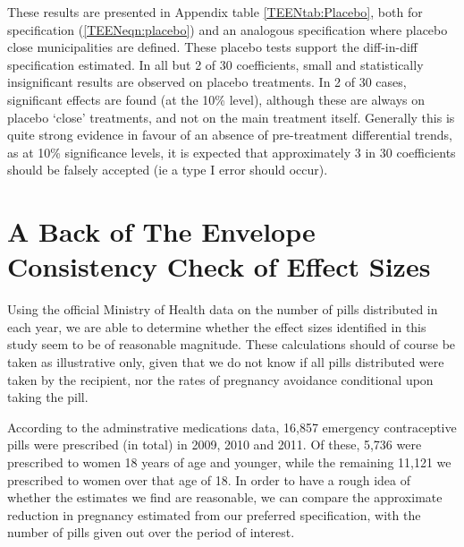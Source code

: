 \documentclass[11pt,subeqn]{article}
\begin{document}
\begin{spacing}{1.4}
These results are presented in Appendix table \ref{TEENtab:Placebo}, both for 
specification (\ref{TEENeqn:placebo}) and an analogous specification where 
placebo close municipalities are defined.  These placebo tests support the 
diff-in-diff specification estimated.  In all but 2 of 30 coefficients, small
and statistically insignificant results are observed on placebo treatments.  In
2 of 30 cases, significant effects are found (at the 10\% level), although these 
are always on placebo `close' treatments, and not on the main treatment itself.  
Generally this is quite strong evidence in favour of an absence of pre-treatment 
differential trends, as at 10\% significance levels, it is expected that 
approximately 3 in 30 coefficients should be falsely accepted (ie a type I error
should occur).




\section{A Back of The Envelope Consistency Check of Effect Sizes}
\label{TEENscn:BOE}
Using the official Ministry of Health data on the number of pills distributed
in each year, we are able to determine whether the effect sizes identified in
this study seem to be of reasonable magnitude.  These calculations should of
course be taken as illustrative only, given that we do not know if all pills
distributed were taken by the recipient, nor the rates of pregnancy avoidance
conditional upon taking the pill.

According to the adminstrative medications data, 16,857 emergency 
contraceptive pills were prescribed (in total) in 2009, 2010 and 2011. Of 
these, 5,736 were prescribed to women 18 years of age and younger, while the
remaining 11,121 we prescribed to women over that age of 18.  In order to have
a rough idea of whether the estimates we find are reasonable, we can compare
the approximate reduction in pregnancy estimated from our preferred 
specification, with the number of pills given out over the period of interest.


\end{spacing}
\end{document}
